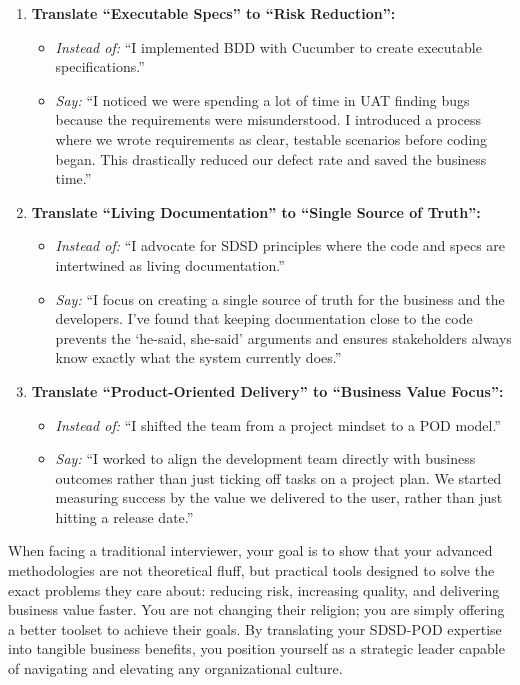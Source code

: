 \begin{enumerate}
\def\labelenumi{\arabic{enumi}.}
\tightlist
\item
  \textbf{Translate ``Executable Specs'' to ``Risk Reduction'':}

  \begin{itemize}
  \tightlist
  \item
    \emph{Instead of:} ``I implemented BDD with Cucumber to create
    executable specifications.''
  \item
    \emph{Say:} ``I noticed we were spending a lot of time in UAT
    finding bugs because the requirements were misunderstood. I
    introduced a process where we wrote requirements as clear, testable
    scenarios before coding began. This drastically reduced our defect
    rate and saved the business time.''
  \end{itemize}
\item
  \textbf{Translate ``Living Documentation'' to ``Single Source of
  Truth'':}

  \begin{itemize}
  \tightlist
  \item
    \emph{Instead of:} ``I advocate for SDSD principles where the code
    and specs are intertwined as living documentation.''
  \item
    \emph{Say:} ``I focus on creating a single source of truth for the
    business and the developers. I've found that keeping documentation
    close to the code prevents the `he-said, she-said' arguments and
    ensures stakeholders always know exactly what the system currently
    does.''
  \end{itemize}
\item
  \textbf{Translate ``Product-Oriented Delivery'' to ``Business Value
  Focus'':}

  \begin{itemize}
  \tightlist
  \item
    \emph{Instead of:} ``I shifted the team from a project mindset to a
    POD model.''
  \item
    \emph{Say:} ``I worked to align the development team directly with
    business outcomes rather than just ticking off tasks on a project
    plan. We started measuring success by the value we delivered to the
    user, rather than just hitting a release date.''
  \end{itemize}
\end{enumerate}

When facing a traditional interviewer, your goal is to show that your
advanced methodologies are not theoretical fluff, but practical tools
designed to solve the exact problems they care about: reducing risk,
increasing quality, and delivering business value faster. You are not
changing their religion; you are simply offering a better toolset to
achieve their goals. By translating your SDSD-POD expertise into
tangible business benefits, you position yourself as a strategic leader
capable of navigating and elevating any organizational culture.

